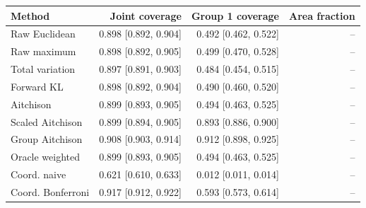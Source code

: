 \begin{tabular}{lrrr}
\toprule
Method & Joint coverage & Group 1 coverage & Area fraction \\
\midrule
Raw Euclidean & 0.898 [0.892, 0.904] & 0.492 [0.462, 0.522] & -- \\
Raw maximum & 0.898 [0.892, 0.905] & 0.499 [0.470, 0.528] & -- \\
Total variation & 0.897 [0.891, 0.903] & 0.484 [0.454, 0.515] & -- \\
Forward KL & 0.898 [0.892, 0.904] & 0.490 [0.460, 0.520] & -- \\
Aitchison & 0.899 [0.893, 0.905] & 0.494 [0.463, 0.525] & -- \\
Scaled Aitchison & 0.899 [0.894, 0.905] & 0.893 [0.886, 0.900] & -- \\
Group Aitchison & 0.908 [0.903, 0.914] & 0.912 [0.898, 0.925] & -- \\
Oracle weighted & 0.899 [0.893, 0.905] & 0.494 [0.463, 0.525] & -- \\
Coord. naive & 0.621 [0.610, 0.633] & 0.012 [0.011, 0.014] & -- \\
Coord. Bonferroni & 0.917 [0.912, 0.922] & 0.593 [0.573, 0.614] & -- \\
\bottomrule
\end{tabular}
